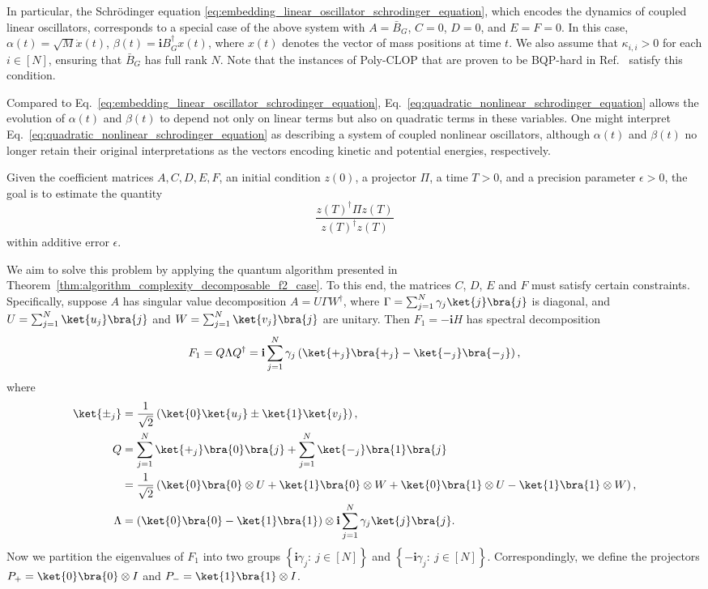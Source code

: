 \documentclass[superscriptaddress,onecolumn,nofootinbib,longbibliography,a4paper,accepted=2026-09-29]{quantumarticle}
\theoremstyle{plain}
\theoremstyle{definition}
\numberwithin{thm}{section}
\numberwithin{assumption}{section}
\numberwithin{lemma}{section}
\numberwithin{prop}{section}
\numberwithin{cor}{section}
\numberwithin{definition}{section}
\numberwithin{rmk}{section}
\numberwithin{equation}{section}
\newcommand{\lrb}[1]{\left ( #1 \right )}
\newcommand{\lrcb}[1]{\left \{ #1 \right \}}
\renewcommand{\i}{\ensuremath{\mathbf{i}}}
\begin{document}
In particular, the Schr\"{o}dinger equation \eqref{eq:embedding_linear_oscillator_schrodinger_equation}, which encodes the dynamics of coupled linear oscillators, corresponds to a special case of the above system with $A=\bar{B}_G$, $C=0$, $D=0$, and $E=F=0$. In this case,  $\alpha(t)=\sqrt{M}\dot{x}(t)$, $\beta(t)=\i B_G^\dagger x(t)$, where $x(t)$ denotes the vector of mass positions at time $t$.
We also assume that $\kappa_{i,i}>0$ for each $i \in [N]$, ensuring that $\bar{B}_G$ has full rank $N$. Note that the instances of Poly-CLOP that are proven to be BQP-hard in Ref.~\cite{babbush2023exponential} satisfy this condition.

Compared to Eq.~\eqref{eq:embedding_linear_oscillator_schrodinger_equation}, Eq.~\eqref{eq:quadratic_nonlinear_schrodinger_equation}
allows the evolution of $\alpha(t)$ and $\beta(t)$ to depend not only on linear terms but also on quadratic terms in these variables. One might interpret Eq.~\eqref{eq:quadratic_nonlinear_schrodinger_equation} as describing a system of coupled nonlinear oscillators, although $\alpha(t)$ and $\beta(t)$ no longer retain their original interpretations as the vectors encoding kinetic and potential energies, respectively.

Given the coefficient matrices $A, C, D, E, F$, an initial condition $z(0)$, a projector $\Pi$,
a time $T>0$, and a precision parameter $\epsilon>0$,
the goal is to estimate the quantity
$$\frac{z(T)^\dagger \Pi z(T)}{z(T)^\dagger z(T)}$$
within additive error $\epsilon$.

We aim to solve this problem by applying the quantum algorithm presented in Theorem~\ref{thm:algorithm_complexity_decomposable_f2_case}. To this end, the matrices $C$, $D$, $E$ and $F$ must satisfy certain constraints. Specifically, suppose $A$ has singular value decomposition $A=U \Gamma W^\dagger$, where $\Gamma=\sum_{j=1}^N \gamma_j \ket{j}\bra{j}$ is diagonal, and
$U=\sum_{j=1}^N \ket{u_j}\bra{j}$ and $W=\sum_{j=1}^{N} \ket{v_j}\bra{j}$ are unitary. Then $F_1=-\i H$ has spectral decomposition 
\begin{align}
    F_1 = Q \Lambda Q^\dagger = \i\sum_{j=1}^N \gamma_j \lrb{\ket{+_j}\bra{+_j} - \ket{-_j}\bra{-_j}},
\end{align}
where     
\begin{align}
\ket{\pm_j}&=\frac{1}{\sqrt{2}}\lrb{\ket{0}\ket{u_j}\pm \ket{1}\ket{v_j}},    \\
Q &= 
\sum_{j=1}^N \ket{+_j}\bra{0}\bra{j}
+
\sum_{j=1}^N \ket{-_j}\bra{1}\bra{j} \\
&=\frac{1}{\sqrt{2}}\lrb{\ket{0}\bra{0}\otimes U+\ket{1}\bra{0}\otimes W+\ket{0}\bra{1}\otimes U-\ket{1}\bra{1}\otimes W},\\
\Lambda &= \lrb{\ket{0}\bra{0} - \ket{1}\bra{1}} \otimes \i 
 \sum_{j=1}^N \gamma_j \ket{j}\bra{j}.        
\end{align}
Now we partition the eigenvalues of $F_1$ into two groups $\lrcb{\i\gamma_j:~j \in [N]}$ and $\lrcb{-\i\gamma_j:~j\in [N]}$. Correspondingly, we define the projectors 
$P_+=\ket{0}\bra{0}\otimes I$
and
$P_-=\ket{1}\bra{1}\otimes I$.
\end{document}
